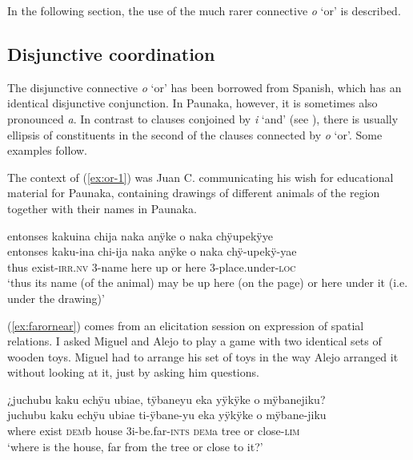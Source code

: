 

In the following section, the use of the much rarer connective \textit{o} ‘or’ is described.

\subsection{Disjunctive coordination}\label{sec:DisjunctiveCoordination}

The disjunctive connective \textit{o} ‘or’ has been borrowed from Spanish, which has an identical disjunctive conjunction. In Paunaka, however, it is sometimes also pronounced \textit{a}. In contrast to clauses conjoined by \textit{i} ‘and’ (see ), there is usually ellipsis of constituents in the second of the clauses connected by \textit{o} ‘or’. Some examples follow.

The context of (\ref{ex:or-1}) was Juan C. communicating his wish for educational material for Paunaka, containing drawings of different animals of the region together with their names in Paunaka.

\ea\label{ex:or-1}
\begingl
\glpreamble entonses kakuina chija naka anÿke o naka chÿupekÿye\\
\gla entonses kaku-ina chi-ija naka anÿke o naka chÿ-upekÿ-yae\\
\glb thus exist-\textsc{irr.nv} 3-name here up or here 3-place.under-\textsc{loc}\\
\glft ‘thus its name (of the animal) may be up here (on the page) or here under it (i.e. under the drawing)’
\endgl
\trailingcitation{[mqx-p110826l.663]}
\xe

(\ref{ex:farornear}) comes from an elicitation session on expression of spatial relations. I asked Miguel and Alejo to play a game with two identical sets of wooden toys. Miguel had to arrange his set of toys in the way Alejo arranged it without looking at it, just by asking him questions.

\ea\label{ex:farornear}
\begingl
\glpreamble ¿juchubu kaku echÿu ubiae, tÿbaneyu eka yÿkÿke o mÿbanejiku?\\
\gla juchubu kaku echÿu ubiae ti-ÿbane-yu eka yÿkÿke o mÿbane-jiku\\
\glb where exist \textsc{dem}b house 3i-be.far-\textsc{ints} \textsc{dem}a tree or close-\textsc{lim}\\
\glft ‘where is the house, far from the tree or close to it?’
\endgl
\trailingcitation{[mtx-e110915ls.57]}
\xe


